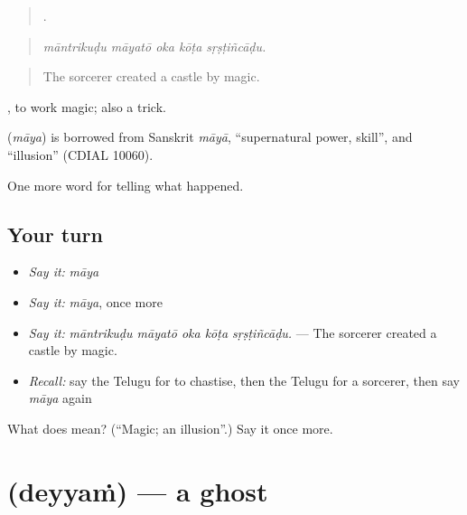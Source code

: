 \begin{quote}
    .
\end{quote}

\begin{quote}
\emph{māntrikuḍu māyatō oka kōṭa sṛṣṭiñcāḍu.}
\end{quote}

\begin{quote}
The sorcerer created a castle by magic.
\end{quote}

 , to work magic; also a trick.

\begin{cousinweb}
\textbf{} (\emph{māya}) is borrowed from Sanskrit \emph{māyā}, \textquotedblleft{}supernatural power, skill\textquotedblright{}, and \textquotedblleft{}illusion\textquotedblright{} (CDIAL 10060).
\end{cousinweb}

\begin{grammarlens}[title={What you've built}]
One more word for telling what happened.
\end{grammarlens}

\subsection*{Your turn}
\begin{itemize}
\raggedright
  \item \emph{Say it:} \emph{māya}
  \item \emph{Say it:} \emph{māya}, once more
  \item \emph{Say it:} \emph{māntrikuḍu māyatō oka kōṭa sṛṣṭiñcāḍu.} — The sorcerer created a castle by magic.
  \item \emph{Recall:} say the Telugu for to chastise, then the Telugu for a sorcerer, then say \emph{māya} again
\end{itemize}

\begin{tcolorbox}[breakable,colback=teal!4,colframe=teal!35!black,title={Before you move on}]
What does  mean? (\textquotedblleft{}Magic; an illusion\textquotedblright{}.) Say it once more.
\end{tcolorbox}
\section[\texorpdfstring{\te{దెయ్యం} (deyyaṁ)}{దెయ్యం (deyyaṁ)}]{ (deyyaṁ) — a ghost}

